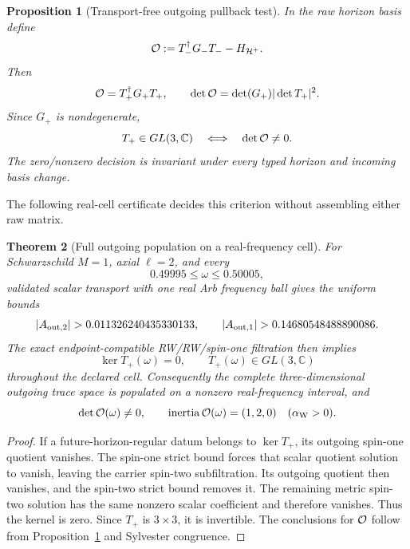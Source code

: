 \documentclass[11pt]{article}
\newtheorem{theorem}{Theorem}[section]
\newtheorem{proposition}[theorem]{Proposition}
\theoremstyle{definition}
\theoremstyle{remark}
\begin{document}
\begin{proposition}[Transport-free outgoing pullback test]
\label{prop:axial-outgoing-pullback}
In the raw horizon basis define
\[
 {\cal O}:=T_-^\dagger G_-T_- -H_{\mathcal H^+}.
\]
Then
\[
 {\cal O}=T_+^\dagger G_+T_+,\qquad
 \det{\cal O}=\det(G_+)|\det T_+|^2.
\]
Since \(G_+\) is nondegenerate,
\[
 T_+\in GL(3,\mathbb C)
 \quad\Longleftrightarrow\quad
 \det{\cal O}\ne0.
\]
The zero/nonzero decision is invariant under every typed horizon and
incoming basis change.
\end{proposition}

The following real-cell certificate decides this criterion without
assembling either raw matrix.

\begin{theorem}[Full outgoing population on a real-frequency cell]
\label{thm:axial-outgoing-population-cell-half}
For Schwarzschild \(M=1\), axial \(\ell=2\), and every
\[
 0.49995\le\omega\le0.50005,
\]
validated scalar transport with one real Arb frequency ball gives the
uniform bounds
\[
 |A_{{\rm out},2}|>0.011326240435330133,\qquad
 |A_{{\rm out},1}|>0.14680548488890086.
\]
The exact endpoint-compatible RW/RW/spin-one filtration then implies
\[
 \ker T_+(\omega)=0,\qquad T_+(\omega)\in GL(3,\mathbb C)
\]
throughout the declared cell.  Consequently the complete
three-dimensional outgoing trace space is populated on a nonzero
real-frequency interval, and
\[
 \det{\cal O}(\omega)\ne0,\qquad
 \operatorname{inertia}{\cal O}(\omega)=(1,2,0)
\quad(\alpha_{\rm W}>0).
\]
\end{theorem}

\begin{proof}
If a future-horizon-regular datum belongs to \(\ker T_+\), its outgoing
spin-one quotient vanishes.  The spin-one strict bound forces that scalar
quotient solution to vanish, leaving the carrier spin-two subfiltration.
Its outgoing quotient then vanishes, and the spin-two strict bound removes
it.  The remaining metric spin-two solution has the same nonzero scalar
coefficient and therefore vanishes.  Thus the kernel is zero.  Since
\(T_+\) is \(3\times3\), it is invertible.  The conclusions for \({\cal O}\)
follow from Proposition~\ref{prop:axial-outgoing-pullback} and Sylvester
congruence.
\end{proof}
\end{document}
